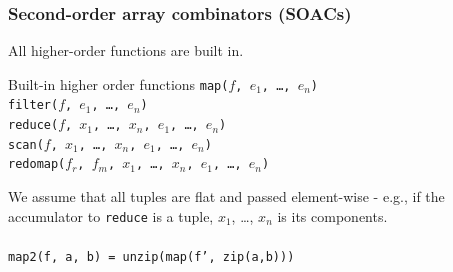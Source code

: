 \documentclass{beamer}
\begin{document}
\begin{frame}[fragile,t]
  \frametitle{Second-order array combinators (SOACs)}

  All higher-order functions are built in.

  \begin{block}{Built-in higher order functions}
    {\tt map($f$, $e_{1}$, \ldots, $e_{n}$)} \\
    {\tt filter($f$, $e_{1}$, \ldots, $e_{n}$)} \\
    {\tt reduce($f$, $x_{1}$, \ldots, $x_{n}$, $e_{1}$, \ldots, $e_{n}$)} \\
    {\tt scan($f$, $x_{1}$, \ldots, $x_{n}$, $e_{1}$, \ldots, $e_{n}$)} \\
    {\tt redomap($f_{r}$, $f_{m}$, $x_{1}$, \ldots, $x_{n}$, $e_{1}$, \ldots, $e_{n}$)} \\
  \end{block}

  We assume that all tuples are flat and passed element-wise - e.g., if
  the accumulator to {\tt reduce} is a tuple, $x_{1}$, \ldots, $x_{n}$
  is its components.
\pause
\\\hfill\\
  {\tt map2(f, a, b) = unzip(map(f', zip(a,b)))}


\end{frame}
\end{document}
